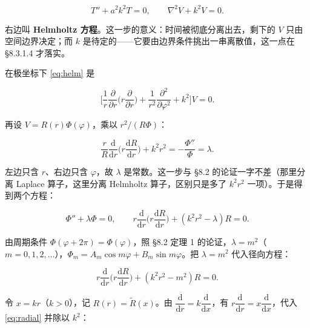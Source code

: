 \begin{equation}
T''+a^2k^2T=0,
\qquad
\nabla^2V+k^2V=0 .
\label{eq:helm}
\end{equation}

右边叫 \textbf{Helmholtz 方程}。这一步的意义：时间被彻底分离出去，剩下的 $V$ 只由空间边界决定；而 $k$ 是待定的——它要由边界条件挑出一串离散值，这一点在 \S8.3.1.4 才落实。


在极坐标下 \eqref{eq:helm} 是

\begin{equation}
\Big[\frac1r\frac{\partial}{\partial r}\Big(r\frac{\partial}{\partial r}\Big)+\frac1{r^2}\frac{\partial^2}{\partial\varphi^2}+k^2\Big]V=0 .
\label{eq:helmPolar}
\end{equation}

再设 $V=R(r)\Phi(\varphi)$，乘以 $r^2/(R\Phi)$：

\begin{equation}
\frac{r}{R}\frac{\mathrm d}{\mathrm dr}\Big(r\frac{\mathrm dR}{\mathrm dr}\Big)+k^2r^2=-\frac{\Phi''}{\Phi}=\lambda .
\label{eq:sep2}
\end{equation}

左边只含 $r$、右边只含 $\varphi$，故 $\lambda$ 是常数。这一步与 \S8.2 的论证一字不差（那里分离 Laplace 算子，这里分离 Helmholtz 算子，区别只是多了 $k^2r^2$ 一项）。于是得到两个方程：

\begin{equation}
\Phi''+\lambda\Phi=0,
\qquad
r\frac{\mathrm d}{\mathrm dr}\Big(r\frac{\mathrm dR}{\mathrm dr}\Big)+(k^2r^2-\lambda)R=0 .
\label{eq:two}
\end{equation}

由周期条件 $\Phi(\varphi+2\pi)=\Phi(\varphi)$，照 \S8.2 定理 1 的论证，$\lambda=m^2$（$m=0,1,2,\dots$），$\Phi_m=A_m\cos m\varphi+B_m\sin m\varphi$。把 $\lambda=m^2$ 代入径向方程：

\begin{equation}
r\frac{\mathrm d}{\mathrm dr}\Big(r\frac{\mathrm dR}{\mathrm dr}\Big)+(k^2r^2-m^2)R=0 .
\label{eq:radial}
\end{equation}


令 $x=kr$（$k>0$），记 $R(r)=\tilde R(x)$。由 $\dfrac{\mathrm d}{\mathrm dr}=k\dfrac{\mathrm d}{\mathrm dx}$，有 $r\dfrac{\mathrm d}{\mathrm dr}=x\dfrac{\mathrm d}{\mathrm dx}$，代入 \eqref{eq:radial} 并除以 $k^2$：

